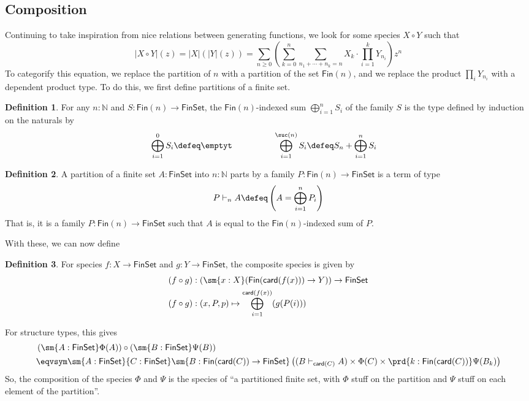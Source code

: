 \documentclass[fleqn]{article}
\newcommand{\card}{\mathsf{card}}
\newcommand{\gf}[1]{\abs{#1}\!(z)}
\newcommand{\fin}{\mathsf{Fin}}
\newcommand{\finset}{\mathsf{FinSet}}
\newcommand{\abs}[1]{\left\lvert #1 \right\rvert}
\theoremstyle{theorem}
\theoremstyle{definition}
\newtheorem{defn}{Definition}[section]
\begin{document}
\subsection{Composition}
Continuing to take inspiration from nice relations between generating
functions, we look for some species $X \circ Y$ such that
\[
  \gf{X \circ Y} = \abs{X}\!(\gf{Y})
  =
  \sum_{n\geq0}\left(
    \sum_{k=0}^{n}\sum_{n_{1} + \dotsb + n_{k} = n}
    X_{k}\cdot \prod_{i=1}^{k}Y_{n_{i}}
  \right) z^{n}
\]
To categorify this equation, we replace the partition of $n$ with a partition
of the set $\fin(n)$, and we replace the product $\prod_{i}Y_{n_{i}}$ with a
dependent product type.  To do this, we first define partitions of a finite
set.
\begin{defn}
  For any $n : \mathbb{N}$ and $S : \fin(n) \to \finset$, the $\fin(n)$-indexed
  sum $\bigoplus_{i=1}^{n} S_{i}$ of the family $S$ is the type defined by
  induction on the naturals by
  \begin{alignat*}{2}
    \bigoplus_{i=1}^{0}S_{i} &\defeq \emptyt
    \qquad\qquad&
    \bigoplus_{i=1}^{\suc(n)}S_{i} &\defeq S_{n} + \bigoplus_{i=1}^{n} S_{i}
  \end{alignat*}
\end{defn}
\begin{defn}
  A partition of a finite set $A : \finset$ into $n : \mathbb{N}$ parts by a
  family $P : \fin(n) \to \finset$ is a term of type
  \[
    P \vdash_{n} A \defeq 
    \left(A = \bigoplus_{i=1}^{n} P_{i}\right)
  \]
  That is, it is a family $P : \fin(n) \to \finset$ such that $A$ is equal
  to the $\fin(n)$-indexed sum of $P$.
\end{defn}

With these, we can now define
\begin{defn}
  For species $f : X \to \finset$ and $g : Y \to \finset$, the composite
  species is given by 
  \begin{align*}
    (f \circ g) &: \left(
      \sm{x : X}(\fin(\card(f(x))) \to Y)
    \right)
    \to
    \finset
    \\
    (f \circ g) &: (x, P, p) \mapsto \bigoplus_{i=1}^{\card(f(x))}(g(P(i)))
  \end{align*}
\end{defn}
\noindent
For structure types, this gives
\begin{align*}
  &\left(\sm{A : \finset}\Phi(A)\right)
  \circ
  \left(\sm{B : \finset}\Psi(B)\right)
  \\&\eqvsym
  \sm{A : \finset}{C:\finset}
  \sm{B : \fin(\card(C)) \to \finset}
  \left(
    (B \vdash_{\card(C)} A)
    \times
    \Phi(C) 
    \times
    \prd{k : \fin(\card(C))}\Psi(B_{k})
  \right)
\end{align*}
So, the composition of the species $\Phi$ and $\Psi$ is the species of ``a
partitioned finite set, with $\Phi$ stuff on the partition and $\Psi$ stuff on
each element of the partition''.
\end{document}
